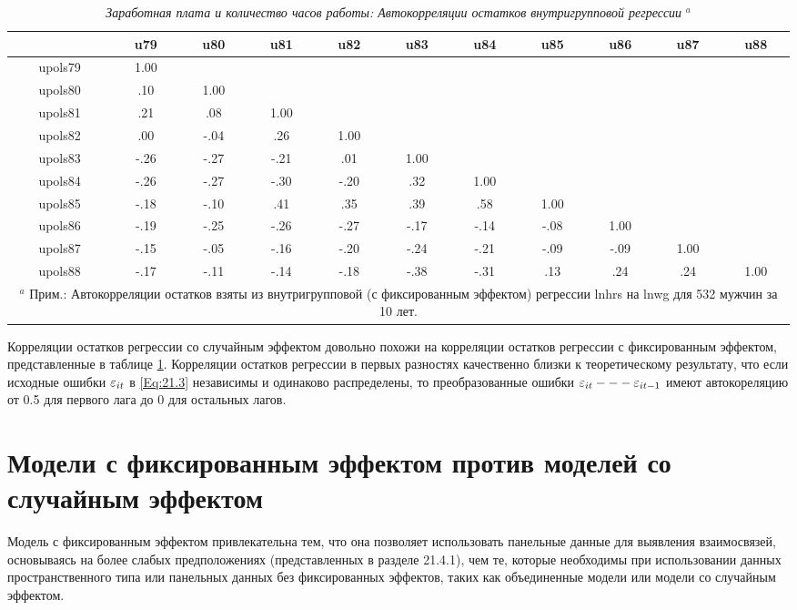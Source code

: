 \begin{table}[ht]
\caption{{\it Заработная плата и количество часов работы: Автокорреляции остатков внутригрупповой регрессии} ${}^a$} 
\centering
\begin{tabular}{ccccccccccc}
\hline \hline
	&	\textbf{u79} & \textbf{u80} & \textbf{u81} & \textbf{u82} & \textbf{u83} & \textbf{u84} & \textbf{u85} & \textbf{u86} & \textbf{u87} & \textbf{u88}  \\
\hline
upols79 & 1.00 & & & & & & & & & \\
upols80 & .10 	& 1.00 & & & & & & & & \\
upols81 & .21	& .08 & 1.00 & & & & & & & \\
upols82 & .00	& -.04 & .26 & 1.00 & & & & & & \\
upols83 & -.26& -.27 & -.21 & .01 & 1.00 & & & & & \\
upols84 & -.26& -.27 & -.30 & -.20 & .32 & 1.00 & & & & \\
upols85 & -.18& -.10 & .41 & .35 & .39 & .58 & 1.00 & & & \\
upols86 & -.19& -.25 & -.26 & -.27 & -.17 & -.14 & -.08 & 1.00 & & \\
upols87 & -.15& -.05 & -.16 & -.20 & -.24 & -.21 & -.09 & -.09 & 1.00 & \\
upols88 & -.17& -.11 & -.14 & -.18 & -.38 & -.31 & .13 & .24 & .24 &  1.00\\
\hline \hline
\multicolumn{11}{p{15cm}}{${}^a$ Прим.: Автокорреляции остатков взяты из внутригрупповой (с фиксированным эффектом) регрессии lnhrs на lnwg для 532 мужчин за 10 лет.}
\end{tabular}
\label{Tab:21.4}
\end{table}

Корреляции остатков регрессии со случайным эффектом довольно похожи на корреляции остатков регрессии с фиксированным эффектом, представленные в таблице \ref{Tab:21.4}. Корреляции остатков регрессии в первых разностях качественно близки к теоретическому результату, что если исходные ошибки $\varepsilon_{it}$ в \ref{Eq:21.3} независимы и одинаково распределены, то преобразованные ошибки $\varepsilon_{it} --- \varepsilon_{it-1}$ имеют автокореляцию от 0.5 для первого лага до 0 для остальных лагов.

\section{Модели с фиксированным эффектом против моделей со случайным эффектом}

Модель с фиксированным эффектом привлекательна тем, что она позволяет использовать панельные данные для выявления взаимосвязей, основываясь на более слабых предположениях (представленных в разделе 21.4.1), чем те, которые необходимы при использовании данных пространственного типа или панельных данных без фиксированных эффектов, таких как объединенные модели или модели со случайным эффектом.

